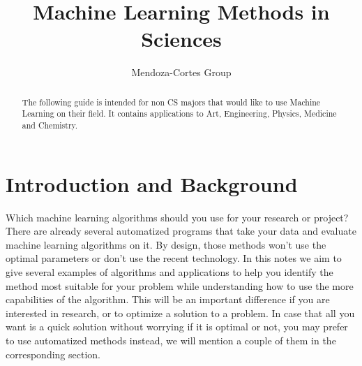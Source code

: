 \documentclass[11pt,letterpaper]{report}
\author{Mendoza-Cortes Group}
\title{Machine Learning Methods in Sciences}
\begin{document}
	
	\setcounter{page}{1}
	\thispagestyle{empty}
	
	
	
	
	\maketitle
	
	\clearpage
	\newpage
	\setcounter{page}{1}
	\pagestyle{fancy}
	
	
	
	
	\begin{abstract}
		The following guide is intended for non CS majors that would like to use  Machine Learning on their field. It contains applications to Art, Engineering, Physics, Medicine and Chemistry.
	\end{abstract}
	
	\clearpage
	\newpage
	\chapter{Introduction and Background}
		Which machine learning algorithms should you use for your research or project? There are already several automatized programs  that take your data and evaluate machine learning algorithms on it. By design, those methods won't use the optimal parameters or don't use the recent technology. In this notes we aim to give several examples of algorithms and applications to help you identify the method most suitable for your problem while understanding how to use the more capabilities of the algorithm. This will be an important difference if you are interested in research, or to optimize a solution to a problem. In case that all you want is a quick solution without worrying if it is optimal or not, you may prefer to use automatized methods instead, we will mention a couple of them in the corresponding section. 
		
\end{document}
